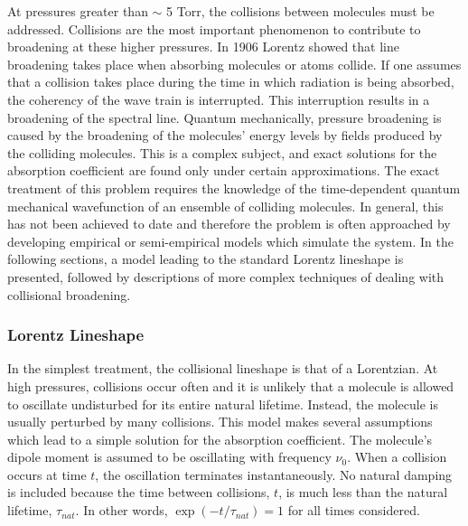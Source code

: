 \documentclass[11pt]{article}
\begin{document}
At pressures greater than $\sim$ 5 Torr, the collisions between molecules
must be addressed.  Collisions are the most important phenomenon to
contribute to broadening at these higher pressures.  In 1906 Lorentz showed
that line broadening takes place when absorbing molecules or atoms collide.
If one assumes that a collision takes place during the time in which
radiation is being absorbed, the coherency of the wave train is
interrupted.  This interruption results in a broadening of the spectral
line.  Quantum mechanically, pressure broadening is caused by the
broadening of the molecules' energy levels by fields produced by the
colliding molecules.  This is a complex
subject, and exact solutions for the absorption coefficient are found only
under certain approximations.  The exact treatment of this problem
requires the knowledge of the time-dependent quantum mechanical
wavefunction of an ensemble of colliding molecules.  In general, this has 
not been achieved to date and therefore the problem is often approached by 
developing empirical or semi-empirical models which simulate the system.
In the following sections, a model leading to the standard Lorentz
lineshape is presented, followed by descriptions of more complex techniques
of dealing with collisional broadening.

\subsubsection{Lorentz Lineshape}\label{sec:lorentz}

In the simplest treatment, the collisional lineshape is that of a
Lorentzian.  At high pressures, collisions occur often and it is unlikely
that a molecule is allowed to oscillate undisturbed for its entire
natural lifetime.  Instead, the molecule is usually perturbed by many 
collisions.  This model makes several assumptions which lead to a simple
solution for the absorption coefficient.  The molecule's dipole moment is
assumed to be oscillating with frequency $\nu_{0}$.  When a collision
occurs at time $t$, the oscillation terminates instantaneously.  No
natural damping is included because the time between collisions,
$t$, is much less than the natural lifetime, $\tau_{nat}$.  In other
words, $\exp(-t/\tau_{nat})=1$ for all times considered.
\end{document}
